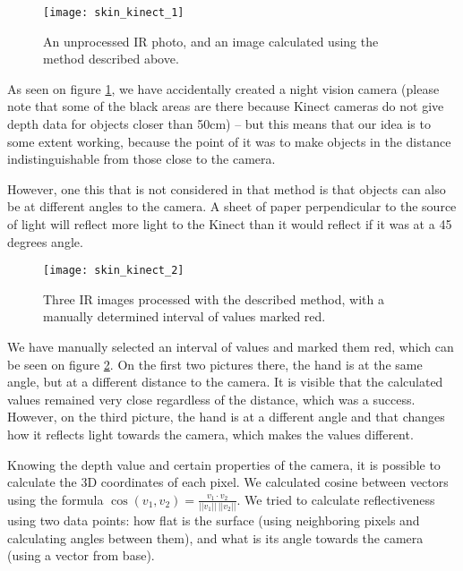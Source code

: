             \begin{figure}[H]
                \caption{An unprocessed IR photo, and an image calculated using
                the method described above.}
                \centering
                \texttt{[image: skin\_kinect\_1]}
                \label{fig:skin_kinect_1}
            \end{figure}

            As seen on figure \ref{fig:skin_kinect_1}, we have accidentally created
            a night vision camera (please note that some of the black areas are there because Kinect cameras do not give depth data for objects closer than 50cm)
            -- but this means that our idea is to some extent working, because the point
            of it was to make objects in the distance indistinguishable from those close
            to the camera.

            However, one this that is not considered in that method is that objects
            can also be at different angles to the camera.
            A sheet of paper perpendicular to the source of light will reflect more
            light to the Kinect than it would reflect if it was at a 45 degrees angle.

            \begin{figure}[H]
                \caption{Three IR images processed with the described method, with a
                manually determined interval of values marked red.}
                \centering
                \texttt{[image: skin\_kinect\_2]}
                \label{fig:skin_kinect_2}
            \end{figure}

            We have manually selected an interval of values and marked them red, which
            can be seen on figure \ref{fig:skin_kinect_2}.
            On the first two pictures there, the hand is at the same angle, but at a
            different distance to the camera.
            It is visible that the calculated values remained very close regardless
            of the distance, which was a success.
            However, on the third picture, the hand is at a different angle and
            that changes how it reflects light towards the camera, which makes the values
            different.

            Knowing the depth value and certain properties of the camera, it is possible
            to calculate the 3D coordinates of each pixel.
            We calculated cosine between vectors using the formula
            $\cos(v_1, v_2) = \frac{v_1 \cdot v_2}{||v_1||~||v_2||}$.
            We tried to calculate reflectiveness using two data points:
            how flat is the surface (using neighboring pixels and calculating angles between them),
            and what is its angle towards the camera (using a vector from base).

